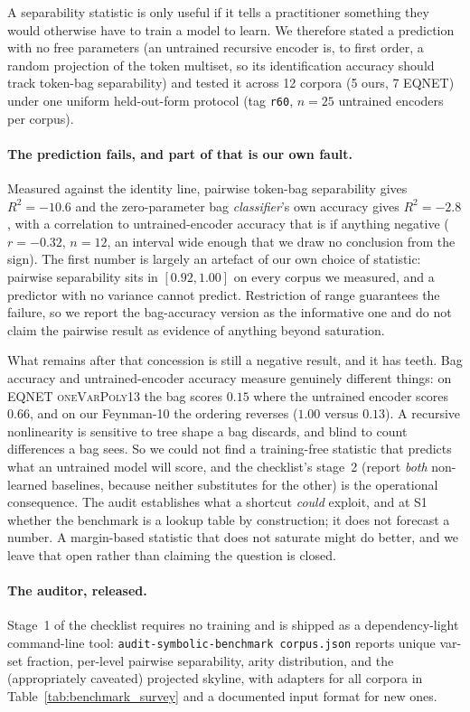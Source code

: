 A separability statistic is only useful if it tells a practitioner something they would otherwise have to train a model to learn. We therefore stated a prediction with no free parameters (an untrained recursive encoder is, to first order, a random projection of the token multiset, so its identification accuracy should track token-bag separability) and tested it across 12 corpora (5 ours, 7 EQNET) under one uniform held-out-form protocol (tag \texttt{r60}, $n{=}25$ untrained encoders per corpus).

\paragraph{The prediction fails, and part of that is our own fault.} Measured against the identity
line, pairwise token-bag separability gives $R^2 = -10.6$ and the zero-parameter bag
\emph{classifier}'s own accuracy gives $R^2 = -2.8$, with a correlation to untrained-encoder
accuracy that is if anything negative ($r = -0.32$, $n{=}12$, an interval wide enough that we
draw no conclusion from the sign). The first number is largely an artefact of our own choice of
statistic: pairwise separability sits in $[0.92, 1.00]$ on every corpus we measured, and a
predictor with no variance cannot predict. Restriction of range guarantees the failure, so we
report the bag-accuracy version as the informative one and do not claim the pairwise result as
evidence of anything beyond saturation.

What remains after that concession is still a negative result, and it has teeth. Bag accuracy and
untrained-encoder accuracy measure genuinely different things: on \textsc{EQNET oneVarPoly13} the
bag scores $0.15$ where the untrained encoder scores $0.66$, and on our Feynman-10 the ordering
reverses ($1.00$ versus $0.13$). A recursive nonlinearity is sensitive to tree shape a bag
discards, and blind to count differences a bag sees. So we could not find a training-free statistic
that predicts what an untrained model will score, and the checklist's stage~2 (report \emph{both}
non-learned baselines, because neither substitutes for the other) is the operational
consequence. The audit establishes what a shortcut \emph{could} exploit, and at S1 whether the
benchmark is a lookup table by construction; it does not forecast a number. A margin-based
statistic that does not saturate might do better, and we leave that open rather than claiming the
question is closed.

\paragraph{The auditor, released.}
Stage~1 of the checklist requires no training and is shipped as a dependency-light command-line tool: \texttt{audit-symbolic-benchmark corpus.json} reports unique var-set fraction, per-level pairwise separability, arity distribution, and the (appropriately caveated) projected skyline, with adapters for all corpora in Table~\ref{tab:benchmark_survey} and a documented input format for new ones.

